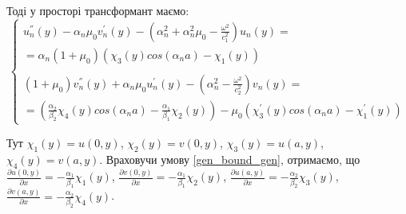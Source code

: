 


Тоді у просторі трансформант маємо:
\begin{equation}\label{transf_gen}
    \begin{cases}
        u_n^{''}(y) - \alpha_n \mu_0 v_n^{'}(y) - (\alpha_n^2 + \alpha_n^2 \mu_0 - \frac{\omega^2}{c_1^2}) u_n(y) = \\
        = \alpha_n(1 + \mu_0)(\chi_3(y) cos(\alpha_n a) - \chi_1(y)) \\
        \\
        (1 + \mu_0) v_n^{''}(y) + \alpha_n \mu_0 u_n^{'}(y) - (\alpha_n^2 - \frac{\omega^2}{c_2^2}) v_n(y) = \\
        = (\frac{\alpha_2}{\beta_2}\chi_4(y) cos(\alpha_n a) - \frac{\alpha_1}{\beta_1}\chi_2(y)) - \mu_0 (\chi_3^{'}(y) cos(\alpha_n a) -\chi_1^{'}(y))
    \end{cases}
\end{equation}

Тут $\chi_1(y) = u(0, y)$, $\chi_2(y) = v(0, y)$, $\chi_3(y) = u(a, y)$, $\chi_4(y) = v(a, y)$.
Враховучи умову \eqref{gen_bound_gen}, отримаємо, що 
$\frac{\partial u(0, y)}{\partial x}=-\frac{\alpha_1}{\beta_1} \chi_1(y)$,
$\frac{\partial v(0, y)}{\partial x}=-\frac{\alpha_1}{\beta_1} \chi_2(y)$,
$\frac{\partial u(a, y)}{\partial x}=-\frac{\alpha_2}{\beta_2} \chi_3(y)$,
$\frac{\partial v(a, y)}{\partial x}=-\frac{\alpha_2}{\beta_2} \chi_4(y)$.

